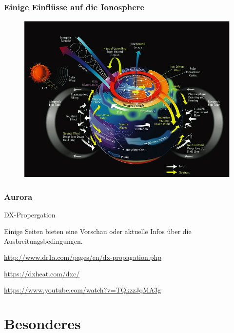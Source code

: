 \begin{frame}
  \frametitle{Einige Einflüsse auf die Ionosphere}
  \begin{center}
  \begin{figure}
    \includegraphics[width=.8\textwidth,height=.8\textheight,keepaspectratio]{e09/Ionosphere-Thermosphere_Processes.jpg}
    \end{figure}
  \end{center}
\end{frame}

\begin{frame}
    \frametitle{Aurora}
	\begin{center}
        \begin{block}{DX-Propergation}
        \item Einige Seiten bieten eine Vorschau oder aktuelle Infos über die Ausbreitungsbedingungen.
        \item \url{http://www.dr1a.com/pages/en/dx-propagation.php}
        \item \url{https://dxheat.com/dxc/}
        \item \url{https://www.youtube.com/watch?v=TQkzzJqMA3g}
        \end{block}
    \end{center}
\end{frame}

\section*{Besonderes}

